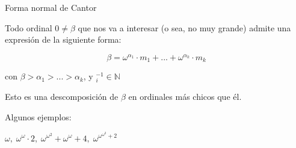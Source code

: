 \documentclass[10pt,spanish]{beamer}
\def\m{^{-1}}
\def\N{\mathbb{N}}
\begin{document}
\begin{frame}{Forma normal de Cantor}

Todo ordinal $0 \neq \beta$ que nos va a interesar (o sea, no muy grande) admite una expresión de la siguiente forma:



$$\beta = \omega^{\alpha_1} \cdot m_1 + ... + \omega^{\alpha_k} \cdot m_k$$

con $\beta > \alpha_1 > ... > \alpha_k$, y $\m_i \in \N$

Esto es una descomposición de $\beta$ en ordinales más chicos que él. \bigskip \pause




Algunos ejemplos:

$\omega\textbf{,}\ \ \omega^\omega \cdot 2\textbf{,}\ \ \omega^{\omega^2} + \omega^\omega + 4\textbf{,}\ \ \omega^{\omega^{\omega^2} + 2}$






\end{frame}
\end{document}
